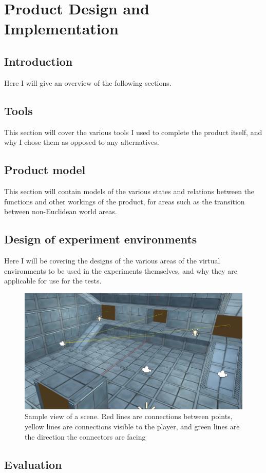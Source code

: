 \chapter[Product]{Product Design and Implementation}
\label{design}

	\section{Introduction}
		Here I will give an overview of the following sections.

	\section{Tools}
		This section will cover the various tools I used to complete the product itself, and why I chose them as opposed to any alternatives.

	\section{Product model}
		This section will contain models of the various states and relations between the functions and other workings of the product, for areas such as the transition between non-Euclidean world areas.

	\section{Design of experiment environments}
		Here I will be covering the designs of the various areas of the virtual environments to be used in the experiments themselves, and why they are applicable for use for the tests.

		\begin{figure}
			\label{design:fig:scene}
			\includegraphics[width=1\textwidth]{Images/Lines_Everywhere}
			\centering
			\caption{Sample view of a scene.
				Red lines are connections between points,
				yellow lines are connections visible to the player,
				and green lines are the direction the connectors are facing}
		\end{figure}

	\section{Evaluation}

